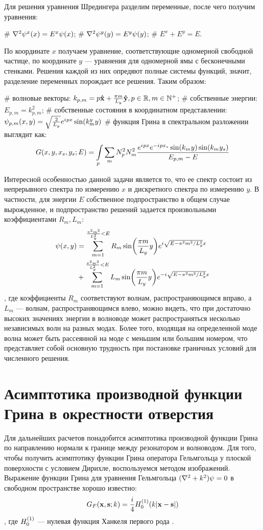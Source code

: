 Для решения уравнения Шредингера разделим переменные, после чего получим уравнения:
\begin{ilist}
# $\laplacian \psi^x(x) = E^x \psi(x)$;
# $\laplacian \psi^y(y) = E^y \psi(y)$;
# $E^x + E^y = E$.
\end{ilist}
По координате $x$ получаем уравнение, соответствующие одномерной свободной частице, по координате $y$ — уравнения для одномерной ямы с бесконечными стенками. Решения каждой из них опредяют полные системы функций, значит, разделение переменных порождает все решения. Таким образом:
\begin{ilist}
# волновые векторы: $k_{p, m} = p \vb{\hat{x}} + \frac{\pi m}{L_y} \vb{\hat{y}}, p \in \mathbb{R}, m \in \mathbb{N}^+$;
# собственные энергии: $E_{p, m} = k_{p, m}^2$;
# собственные состояния в координатном представлении: $\psi_{p, m}(x, y) = \sqrt{\frac{2}{L_y}} e^{{i\mkern1mu} p x} \sin(k^y_m y)$
# функция Грина в спектральном разложении выглядит как: 
\[
G(x, y, x_s, y_s; E) = \int\limits_p \sum\limits_m N_p^2 N_m^2 \frac{e^{{i\mkern1mu} p x} e^{-{i\mkern1mu} p x_s} \sin(k_m y) \sin(k_m y_s)}{E_{p, m} - E}
\]
\end{ilist}
Интересной особенностью данной задачи является то, что ее спектр состоит из непрерывного спектра по измерению $x$ и дискретного спектра по измерению $y$. В частности, для энергии $E$ собственное подпространство в общем случае вырожденное, и подпространство решений задается произвольными коэффициентами $R_m, L_m$:
\begin{align*}
\psi(x, y)
& = \sum\limits_{m = 1}^{\frac{\pi^2 m^2}{L_y^2} < E} R_m \sin(\frac{\pi m}{L_y} y) e^{{i\mkern1mu} \sqrt{E - \pi^2 m^2 / L_y^2} x} \\
& + \sum\limits_{m = 1}^{\frac{\pi^2 m^2}{L_y^2} < E} L_m \sin(\frac{\pi m}{L_y} y) e^{-{i\mkern1mu} \sqrt{E - \pi^2 m^2 / L_y^2} x}
\end{align*}
, где коэффициенты $R_m$ соответствуют волнам, распространяющимся вправо, а $L_m$ — волнам, распространяющимся влево, можно видеть, что при достаточно высоких значениях энергии в волноводе может распространяться несколько независимых волн на разных модах. Более того, входящая на определенной моде волна может быть рассеянной на моде с меньшим или большим номером, что представляет собой основную трудность при постановке граничных условий для численного решения.

\section{Асимптотика производной функции Грина в окрестности отверстия}
Для дальнейших расчетов понадобится асимптотика производной функции Грина по направлению нормали к границе между резонатором и волноводом. Для того, чтобы получить асимптотику функции Грина оператора Гельмгольца у плоской поверхности с условием Дирихле, воспользуемся методом изображений. Выражение функции Грина для уравнения Гельмгольца $(\laplacian + k^2) \psi = 0$ в свободном пространстве хорошо известно:
\[
G_F(\vb{x}, \vb{s}; k) = \frac{i}{4} H_{0}^{(1)}(k |\vb{x} - \vb{s}|)
\],
где $H_{0}^{(1)}$ — нулевая функция Ханкеля первого рода \cite{hankel_first_kind}.

